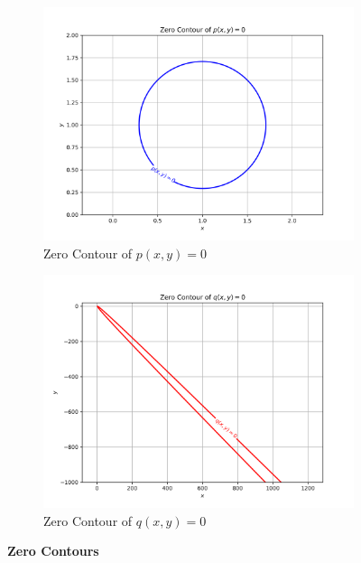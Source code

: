 \documentclass[conference,onecolumn]{IEEEtran}
\begin{document}
\begin{enumerate}[label=\arabic{enumi}.]
\begin{enumerate}
\begin{figure}[H]
\begin{subfigure}{.49\linewidth}
                            \includegraphics[width=.99\linewidth]{figs/zero_contour_p.png}
                            \caption{Zero Contour of $p(x, y) = 0$}
                        \end{subfigure}
                        \begin{subfigure}{.49\linewidth}
                            \includegraphics[width=.99\linewidth]{figs/zero_contour_q.png}
                            \caption{Zero Contour of $q(x, y) = 0$}
                        \end{subfigure}
                        \caption{\textbf{Zero Contours}}
                    \end{figure}


\end{enumerate}
\end{enumerate}
\end{document}
